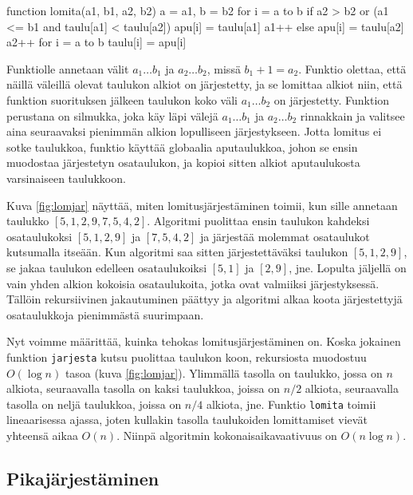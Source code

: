 \begin{code}
function lomita(a1, b1, a2, b2)
    a = a1, b = b2
    for i = a to b
        if a2 > b2 or (a1 <= b1 and taulu[a1] < taulu[a2])
            apu[i] = taulu[a1]
            a1++
        else
            apu[i] = taulu[a2]
            a2++
    for i = a to b
        taulu[i] = apu[i]
\end{code}

Funktiolle annetaan välit $a_1 \dots b_1$ ja $a_2 \dots b_2$,
missä $b_1+1=a_2$.
Funktio olettaa, että näillä väleillä olevat 
taulukon alkiot on järjestetty,
ja se lomittaa alkiot niin, että funktion suorituksen jälkeen
taulukon koko väli $a_1 \dots b_2$ on järjestetty.
Funktion perustana on silmukka, joka käy läpi välejä
$a_1 \dots b_1$ ja $a_2 \dots b_2$ rinnakkain ja valitsee
aina seuraavaksi pienimmän alkion lopulliseen järjestykseen.
Jotta lomitus ei sotke taulukkoa,
funktio käyttää globaalia aputaulukkoa,
johon se ensin muodostaa järjestetyn osataulukon,
ja kopioi sitten alkiot aputaulukosta varsinaiseen taulukkoon.

Kuva \ref{fig:lomjar} näyttää, miten lomitusjärjestäminen
toimii, kun sille annetaan taulukko $[5,1,2,9,7,5,4,2]$.
Algoritmi puolittaa ensin taulukon kahdeksi osataulukoksi
$[5,1,2,9]$ ja $[7,5,4,2]$ ja järjestää molemmat
osataulukot kutsumalla itseään.
Kun algoritmi saa sitten järjestettäväksi taulukon $[5,1,2,9]$,
se jakaa taulukon edelleen osataulukoiksi $[5,1]$ ja $[2,9]$, jne.
Lopulta jäljellä on vain yhden alkion kokoisia
osataulukoita, jotka ovat valmiiksi järjestyksessä.
Tällöin rekursiivinen jakautuminen päättyy ja algoritmi
alkaa koota järjestettyjä osataulukkoja pienimmästä suurimpaan.

Nyt voimme määrittää, kuinka tehokas lomitusjärjestäminen on.
Koska jokainen funktion \texttt{jarjesta} kutsu
puolittaa taulukon koon, rekursiosta muodostuu
$O(\log n)$ tasoa  (kuva \ref{fig:lomjar}).
Ylimmällä tasolla on taulukko,
jossa on $n$ alkiota,
seuraavalla tasolla on kaksi taulukkoa,
joissa on $n/2$ alkiota,
seuraavalla tasolla on neljä taulukkoa,
joissa on $n/4$ alkiota, jne.
Funktio \texttt{lomita} toimii lineaarisessa ajassa,
joten kullakin tasolla taulukoiden lomittamiset vievät yhteensä
aikaa $O(n)$.
Niinpä algoritmin kokonaisaikavaativuus on $O(n \log n)$.

\subsection{Pikajärjestäminen}


